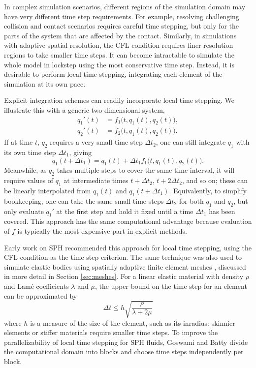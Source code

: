 In complex simulation scenarios, different regions of the simulation domain may have very different time step requirements.
For example, resolving challenging collision and contact scenarios requires careful time stepping, but only for the parts of the system that are affected by the contact.
Similarly, in simulations with adaptive spatial resolution, the CFL condition requires finer-resolution regions to take smaller time steps.
It can become intractable to simulate the whole model in lockstep using the most conservative time step.
Instead, it is desirable to perform local time stepping, integrating each element of the simulation at its own pace.

Explicit integration schemes can readily incorporate local time stepping.
We illustrate this with a generic two-dimensional system,
\begin{align}
  q_1'(t) &= f_1\big(t, q_1(t), q_2(t)\big), \\
  q_2'(t) &= f_2\big(t, q_1(t), q_2(t)\big).
\end{align}
If at time $t$, $q_2$ requires a very small time step $\Delta t_2$, one can still integrate $q_1$ with its own time step $\Delta t_1$, giving
\begin{equation}
  q_1(t+\Delta t_1) = q_1(t) + \Delta t_1 f_1\big(t, q_1(t), q_2(t)\big).
\end{equation}
Meanwhile, as $q_2$ takes multiple steps to cover the same time interval, it will require values of $q_1$ at intermediate times $t+\Delta t_2$, $t+2\Delta t_2$, and so on; these can be linearly interpolated from $q_1(t)$ and $q_1(t+\Delta t_1)$.
Equivalently, to simplify bookkeeping, one can take the same small time steps $\Delta t_2$ for both $q_1$ and $q_2$, but only evaluate $q_1'$ at the first step and hold it fixed until a time $\Delta t_1$ has been covered.
This approach has the same computational advantage because evaluation of $f$ is typically the most expensive part in explicit methods.

Early work on SPH \cite{Desbrun1996,Desbrun1999} recommended this approach for local time stepping, using the CFL condition as the time step criterion.
The same technique was also used to simulate elastic bodies using spatially adaptive finite element meshes \cite{Debunne2001}, discussed in more detail in Section \ref{sec:meshes}.
For a linear elastic material with density $\rho$ and Lam\'e coefficients $\lambda$ and $\mu$, the upper bound on the time step for an element can be approximated by
\begin{equation}
  \label{eq:cfl-fem}
  \Delta t \le h\sqrt{\frac\rho{\lambda+2\mu}}
\end{equation}
where $h$ is a measure of the size of the element, such as its inradius: skinnier elements or stiffer materials require smaller time steps.
To improve the parallelizability of local time stepping for SPH fluids, Goswami and Batty \cite{Goswami2014} divide the computational domain into blocks and choose time steps independently per block.

